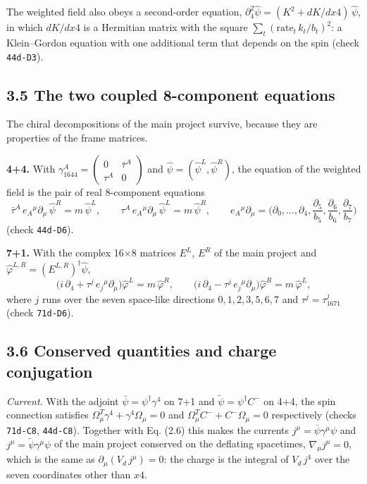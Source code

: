 \documentclass[
  10pt,
]{article}
\begin{document}
The weighted field also obeys a second-order equation,
\(\partial_4^2\hat\psi=(K^2+dK/dx4)\,\hat\psi\), in which \(dK/dx4\) is
a Hermitian matrix with the square
\(\sum_t(\mathrm{rate}_t\,k_t/b_t)^2\): a Klein--Gordon equation with
one additional term that depends on the spin (check \texttt{44d-D3}).

\hypertarget{the-two-coupled-8-component-equations}{%
\subsection{3.5 The two coupled 8-component
equations}\label{the-two-coupled-8-component-equations}}

The chiral decompositions of the main project survive, because they are
properties of the frame matrices.

\textbf{4+4.} With
\(\gamma_{1644}^A=\begin{pmatrix}0&\bar\tau^A\\\tau^A&0\end{pmatrix}\)
and \(\hat\psi=(\hat\psi^L,\hat\psi^R)\), the equation of the weighted
field is the pair of real 8-component equations
\[\bar\tau^A\,e_A{}^\mu\partial_\mu\,\hat\psi^R=m\,\hat\psi^L,\qquad
\tau^A\,e_A{}^\mu\partial_\mu\,\hat\psi^L=m\,\hat\psi^R,\qquad
e_A{}^\mu\partial_\mu=\Big(\partial_0,\dots,\partial_4,\frac{\partial_5}{b_5},\frac{\partial_6}{b_6},\frac{\partial_7}{b_7}\Big)\tag{3.11}\]
(check \texttt{44d-D6}).

\textbf{7+1.} With the complex 16×8 matrices \(E^L\), \(E^R\) of the
main project and \(\hat\varphi^{L,R}=(E^{L,R})^\dagger\hat\psi\),
\[\big(i\,\partial_4+\tau^j\,e_j{}^\mu\partial_\mu\big)\hat\varphi^L=m\,\hat\varphi^R,\qquad
\big(i\,\partial_4-\tau^j\,e_j{}^\mu\partial_\mu\big)\hat\varphi^R=m\,\hat\varphi^L,\tag{3.12}\]
where \(j\) runs over the seven space-like directions \(0,1,2,3,5,6,7\)
and \(\tau^j=\tau_{1671}^j\) (check \texttt{71d-D6}).

\hypertarget{conserved-quantities-and-charge-conjugation}{%
\subsection{3.6 Conserved quantities and charge
conjugation}\label{conserved-quantities-and-charge-conjugation}}

\emph{Current.} With the adjoint \(\bar\psi=\psi^\dagger\gamma^4\) on
7+1 and \(\tilde\psi=\psi^\dagger C^-\) on 4+4, the spin connection
satisfies \(\Omega_\mu^{T}\gamma^4+\gamma^4\Omega_\mu=0\) and
\(\Omega_\mu^{T}C^-+C^-\Omega_\mu=0\) respectively (checks
\texttt{71d-C8}, \texttt{44d-C8}). Together with Eq. (2.6) this makes
the currents \(j^\mu=\bar\psi\gamma^\mu\psi\) and
\(j^\mu=\tilde\psi\gamma^\mu\psi\) of the main project conserved on the
deflating spacetimes, \(\nabla_\mu j^\mu=0\), which is the same as
\(\partial_\mu(V_d\,j^\mu)=0\): the charge is the integral of
\(V_d\,j^4\) over the seven coordinates other than \(x4\).
\end{document}
